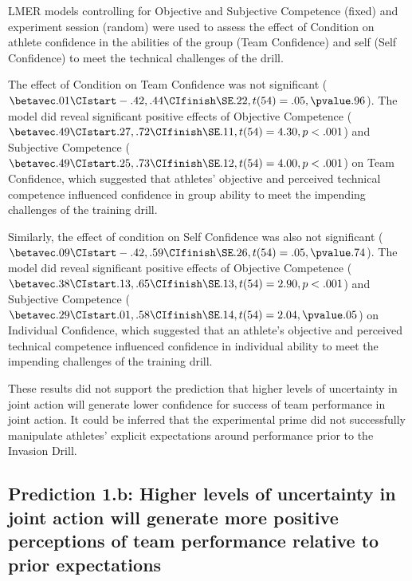 \begin{CJK}{UTF8}{gbsn}
LMER models controlling for Objective and Subjective Competence (fixed) and experiment session (random) were used to assess the effect of Condition on athlete confidence in the abilities of the group (Team Confidence) and self (Self Confidence) to meet the technical challenges of the drill.

The effect of Condition on Team Confidence was not significant ($\betavec .01 \CIstart -.42, .44 \CIfinish \SE .22, t(54)= .05, \pvalue .96$). The model did reveal significant positive effects of Objective Competence ($\betavec .49 \CIstart .27, .72 \CIfinish \SE .11, t(54)= 4.30, p <.001$) and Subjective Competence ($\betavec .49 \CIstart .25, .73 \CIfinish \SE .12, t(54)= 4.00, p < .001$) on Team Confidence, which suggested that athletes' objective and perceived technical competence influenced confidence in group ability to meet the impending challenges of the training drill.

Similarly, the effect of condition on Self Confidence was also not significant ($\betavec .09 \CIstart -.42, .59 \CIfinish \SE .26, t(54)= .05, \pvalue .74$).
The model did reveal significant positive effects of Objective Competence ($\betavec .38 \CIstart .13, .65 \CIfinish \SE .13, t(54)= 2.90, p <.001$) and Subjective Competence ($\betavec .29 \CIstart .01, .58 \CIfinish \SE .14, t(54)= 2.04, \pvalue .05$) on Individual Confidence, which suggested that an athlete's objective and perceived technical competence influenced confidence in individual ability to meet the impending challenges of the training drill.

These results did not support the prediction that higher levels of uncertainty in joint action will generate lower confidence for success of team performance in joint action.  It could be inferred that the experimental prime did not successfully manipulate athletes' explicit expectations around performance prior to the Invasion Drill.


\subsection{Prediction 1.b: Higher levels of uncertainty in joint action will generate more positive perceptions of team performance relative to prior expectations}



\end{CJK}
